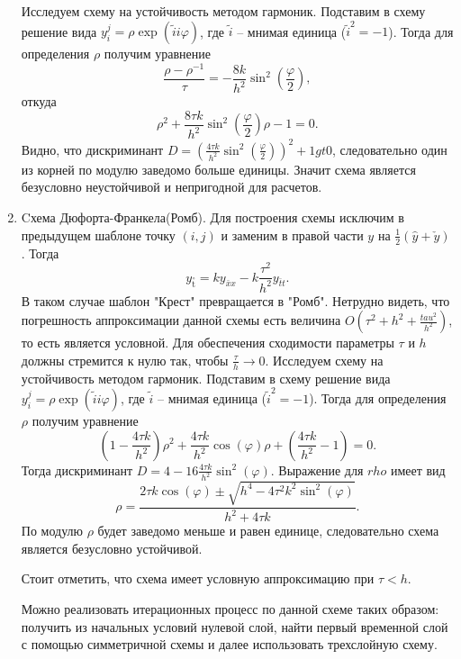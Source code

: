 \documentclass[12pt, a4paper]{article}
\renewcommand{\phi}{\varphi}
\newcommand{\widecheck}[1]{\check{#1}}
\newcommand{\down}[1]{\widecheck{#1}}
\newcommand{\pon}[1]{\mathop {#1}\limits^ \circ}
\begin{document}
\begin{enumerate}
		Исследуем схему на устойчивость методом гармоник. Подставим в схему решение вида $y_i^j = \rho \exp{(\widetilde{i} i \phi)}$, где $\widetilde{i}$ -- мнимая единица ($\widetilde{i}^2 = -1$). Тогда для определения $\rho$ получим уравнение
		\begin{equation*}
			\frac{\rho-\rho^{-1}}{\tau} = -\frac{8k}{h^2}\sin^2(\frac{\phi}{2}),
		\end{equation*}
		откуда
		\begin{equation*}
		\rho^2 + \frac{8\tau k}{h^2} \sin^2(\frac{\phi}{2}) \rho - 1 = 0.
		\end{equation*}
		Видно, что дискриминант $D = (\frac{4\tau k}{h^2} \sin^2(\frac{\phi}{2}))^2 + 1 gt 0$, следовательно один из корней по модулю заведомо больше единицы. Значит схема является безусловно неустойчивой и непригодной для расчетов.
		\item Cхема Дюфорта-Франкела(Ромб).
		Для построения схемы исключим в предыдущем шаблоне точку $(i, j)$ и заменим в правой части $y$ на $\frac{1}{2}(\hat{y} + \down{y})$. Тогда
		\begin{equation*}
			y_{\pon{t}} = k y_{\bar{x}x} - k \frac{\tau^2}{h^2} y_{\bar{t}t}.
		\end{equation*}
		В таком случае шаблон "Крест" превращается в "Ромб". Нетрудно видеть, что погрешность аппроксимации данной схемы есть величина $O(\tau^2 + h^2 + \frac{tau^2}{h^2})$, то есть является условной. Для обеспечения сходимости параметры $\tau$ и $h$ должны стремится к нулю так, чтобы $\frac{\tau}{h} \to 0$. 
		Исследуем схему на устойчивость методом гармоник. Подставим в схему решение вида $y_i^j = \rho \exp{(\widetilde{i} i \phi)}$, где $\widetilde{i}$ -- мнимая единица ($\widetilde{i}^2 = -1$). Тогда для определения $\rho$ получим уравнение
		\begin{equation*}
			(1 - \frac{4 \tau k}{h^2}) \rho^2 + \frac{4 \tau k} {h^2} \cos(\phi) \rho + (\frac{4 \tau k} {h^2} - 1) = 0.
		\end{equation*}
		Тогда дискриминант $D = 4 - 16 \frac{4 \tau k} {h^2} \sin^2(\phi)$. Выражение для $rho$ имеет вид
		\begin{equation*}
			\rho = \frac{2 \tau k \cos(\phi) \pm \sqrt{h^4 - 4\tau^2 k^2 \sin^2(\phi)}}{h^2 + 4\tau k}.
		\end{equation*}
		По модулю $\rho$ будет заведомо меньше и равен единице, следовательно схема является безусловно устойчивой. 
		
		Стоит отметить, что схема имеет условную аппроксимацию при $\tau < h$.
		
		
		Можно реализовать итерационных процесс по данной схеме таких образом: получить из начальных условий нулевой слой, найти первый временной слой с помощью симметричной схемы и далее использовать трехслойную схему.
	\end{enumerate}
	
\end{document}
